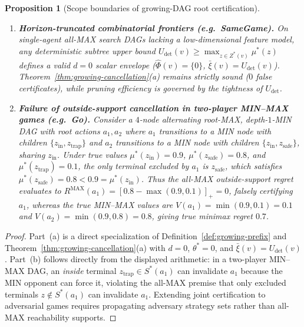 \documentclass{article}
\theoremstyle{plain}
\newtheorem{proposition}[theorem]{Proposition}
\theoremstyle{definition}
\begin{document}
\begin{proposition}[Scope boundaries of growing-DAG root certification]
\label{prop:growing-scope}
\leavevmode
\begin{enumerate}[label=(\alph*),leftmargin=1.8em]
  \item \textbf{Horizon-truncated combinatorial frontiers (e.g.\ SameGame).} On single-agent all-MAX search DAGs lacking a low-dimensional feature model, any deterministic subtree upper bound $U_{\mathrm{det}}(v) \ge \max_{z \in Z^*(v)} \mu^*(z)$ defines a valid $d = 0$ scalar envelope ($\widehat\Phi(v) = \{0\}$, $\bar\xi(v) = U_{\mathrm{det}}(v)$). Theorem~\ref{thm:growing-cancellation}(a) remains strictly sound ($0$ false certificates), while pruning efficiency is governed by the tightness of $U_{\mathrm{det}}$.
  \item \textbf{Failure of outside-support cancellation in two-player MIN--MAX games (e.g.\ Go).} Consider a $4$-node alternating root-MAX, depth-$1$-MIN DAG with root actions $a_1, a_2$ where $a_1$ transitions to a MIN node with children $\{z_{\mathrm{in}}, z_{\mathrm{trap}}\}$ and $a_2$ transitions to a MIN node with children $\{z_{\mathrm{in}}, z_{\mathrm{safe}}\}$, sharing $z_{\mathrm{in}}$. Under true values $\mu^*(z_{\mathrm{in}}) = 0.9$, $\mu^*(z_{\mathrm{safe}}) = 0.8$, and $\mu^*(z_{\mathrm{trap}}) = 0.1$, the only terminal excluded by $a_1$ is $z_{\mathrm{safe}}$, which satisfies $\mu^*(z_{\mathrm{safe}}) = 0.8 < 0.9 = \mu^*(z_{\mathrm{in}})$. Thus the all-MAX outside-support regret evaluates to $R^{\mathrm{MAX}}(a_1) = [0.8 - \max(0.9, 0.1)]_+ = 0$, falsely certifying $a_1$, whereas the true MIN--MAX values are $V(a_1) = \min(0.9, 0.1) = 0.1$ and $V(a_2) = \min(0.9, 0.8) = 0.8$, giving true minimax regret $0.7$.
\end{enumerate}
\end{proposition}

\begin{proof}
Part~(a) is a direct specialization of Definition~\ref{def:growing-prefix} and Theorem~\ref{thm:growing-cancellation}(a) with $d = 0$, $\theta^* = 0$, and $\bar\xi(v) = U_{\mathrm{det}}(v)$. Part~(b) follows directly from the displayed arithmetic: in a two-player MIN--MAX DAG, an \emph{inside} terminal $z_{\mathrm{trap}} \in S^*(a_1)$ can invalidate $a_1$ because the MIN opponent can force it, violating the all-MAX premise that only excluded terminals $z \notin S^*(a_1)$ can invalidate $a_1$. Extending joint certification to adversarial games requires propagating adversary strategy sets rather than all-MAX reachability supports.
\end{proof}
\end{document}
